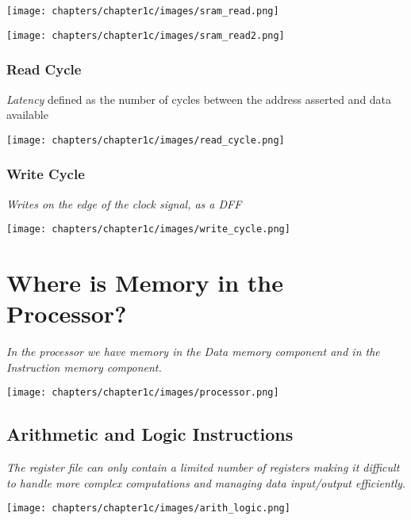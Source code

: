 \begin{minipage}[htp]{0.45\textwidth}
    \begin{center}
        \texttt{[image: chapters/chapter1c/images/sram\_read.png]}
    \end{center}
\end{minipage}
\hfill
\vline
\hfill
\begin{minipage}[htp]{0.45\textwidth}
    \begin{center}
        \texttt{[image: chapters/chapter1c/images/sram\_read2.png]}
    \end{center}
\end{minipage}

\subsubsection{Read Cycle}
\textit{Latency} defined as the number of cycles between the address asserted and data available \\ \vspace*{5px}
\begin{center}
    \texttt{[image: chapters/chapter1c/images/read\_cycle.png]}
\end{center}
\subsubsection{Write Cycle}
\textit{Writes on the edge of the clock signal, as a DFF} \\ \vspace*{5px}
\begin{center}
    \texttt{[image: chapters/chapter1c/images/write\_cycle.png]}
\end{center}


\section{Where is Memory in the Processor?}
\textit{In the processor we have memory in the Data memory component and in the Instruction memory component.} \\ \vspace*{5px}
\begin{center}
    \texttt{[image: chapters/chapter1c/images/processor.png]}
\end{center}
\subsection{Arithmetic and Logic Instructions}
\textit{The register file can only contain a limited number of registers making it difficult to handle more complex computations and managing data input/output efficiently.}
\begin{center}
    \texttt{[image: chapters/chapter1c/images/arith\_logic.png]}
\end{center}
